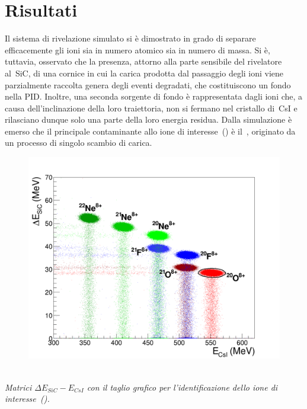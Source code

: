 \documentclass[10pt,foldmark,notumble]{leaflet}
\begin{document}
\section{Risultati}

Il sistema di rivelazione simulato si è dimostrato in grado di separare efficacemente gli ioni sia in numero atomico sia in numero di massa.
Si è, tuttavia, osservato che la presenza, attorno alla parte sensibile del rivelatore al~SiC, di una cornice in cui la carica prodotta dal passaggio degli ioni viene parzialmente raccolta genera degli eventi degradati, che costituiscono un fondo nella PID.
Inoltre, una seconda sorgente di fondo è rappresentata dagli ioni che, a causa dell'inclinazione della loro traiettoria, non si fermano nel cristallo di~CsI e rilasciano dunque solo una parte della loro energia residua.
Dalla simulazione è emerso che il principale contaminante allo ione di interesse~() è il~, originato da un processo di singolo scambio di carica.
\begin{figure} [!t]
	\centering
	\includegraphics[width=0.7\columnwidth, keepaspectratio]{Grafici_Tesi2/PIDnew/deltaE_Ecsi_quadrata_taglio_menoeventi2.png}
\end{figure}\\
\textit{ Matrici $\Delta E_{SiC} - E_{CsI}$ con il taglio grafico per l'identificazione dello ione di interesse~().}
\end{document}
